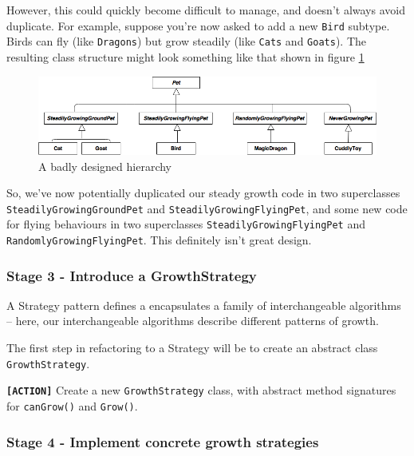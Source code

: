 \documentclass[
]{book}
\begin{document}
However, this could quickly become difficult to manage, and doesn't always avoid duplicate. For example, suppose you're now asked to add a new \texttt{Bird} subtype. Birds can fly (like \texttt{Dragons}) but grow steadily (like \texttt{Cats} and \texttt{Goats}). The resulting class structure might look something like that shown in figure \ref{fig:petsubclasses2-fig}

\begin{figure}

{\centering \includegraphics[width=1\linewidth]{images/GrowthSubclasses2} 

}

\caption{A badly designed hierarchy}\label{fig:petsubclasses2-fig}
\end{figure}

So, we've now potentially duplicated our steady growth code in two superclasses \texttt{SteadilyGrowingGroundPet} and \texttt{SteadilyGrowingFlyingPet}, and some new code for flying behaviours in two superclasses \texttt{SteadilyGrowingFlyingPet} and \texttt{RandomlyGrowingFlyingPet}. This definitely isn't great design.

\hypertarget{growthstrategy}{%
\subsubsection{Stage 3 - Introduce a GrowthStrategy}\label{growthstrategy}}

A Strategy pattern defines a encapsulates a family of interchangeable algorithms -- here, our interchangeable algorithms describe different patterns of growth.

The first step in refactoring to a Strategy will be to create an abstract class \texttt{GrowthStrategy}.

\textbf{\texttt{{[}ACTION{]}}} \color{black} Create a new \texttt{GrowthStrategy} class, with abstract method signatures for \texttt{canGrow()} and \texttt{Grow()}.

\hypertarget{growthstrategies}{%
\subsubsection{Stage 4 - Implement concrete growth strategies}\label{growthstrategies}}
\end{document}

